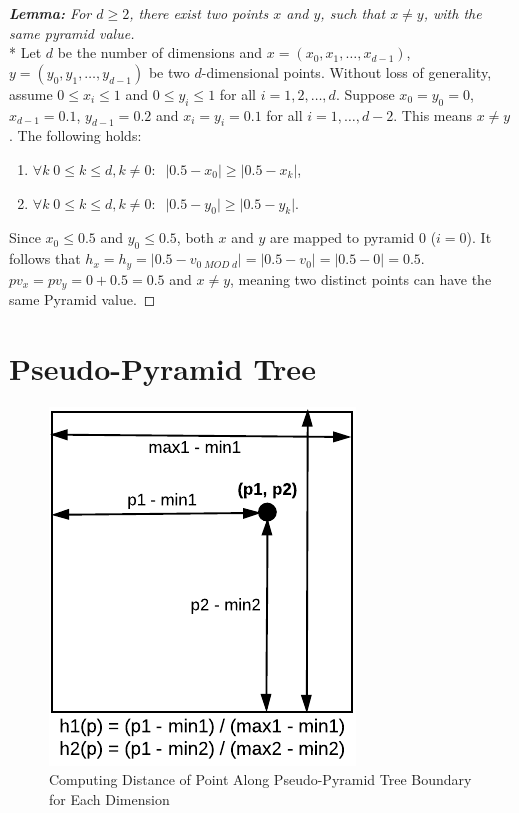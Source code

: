 \begin{proof}[\textbf{Lemma: } For $d \geq 2$, there exist two points $x$ and $y$, such that $x \neq y$, with the same pyramid value]\mbox{}\\*
Let $d$ be the number of dimensions and $x = (x_0, x_1, \dots, x_{d -1})$, $y = (y_0, y_1, \dots, y_{d - 1})$ be two $d$-dimensional points. Without loss of generality, assume $0 \leq x_i \leq 1$ and $0 \leq y_i \leq 1$ for all $i = 1, 2, \dots, d$. Suppose $x_0 = y_0 = 0$, $x_{d - 1} = 0.1$, $y_{d - 1} = 0.2$ and $x_i = y_i = 0.1$ for all $i = 1, \dots, {d - 2}$. This means $x \neq y$. The following holds:
\begin{enumerate}
	\item $\forall k \; 0 \leq k \leq d, k \neq 0: \;\; \lvert 0.5 - x_0 \rvert \geq \lvert 0.5 - x_k \rvert$,
	\item $\forall k \; 0 \leq k \leq d, k \neq 0: \;\; \lvert 0.5 - y_0 \rvert \geq \lvert 0.5 - y_k \rvert$.
\end{enumerate}
Since $x_0 \leq 0.5$ and $y_0 \leq 0.5$, both $x$ and $y$ are mapped to pyramid 0 ($i = 0$). It follows that $h_x = h_y = \lvert 0.5 - v_{0 \; MOD \; d} \rvert = \lvert 0.5 - v_{0} \rvert = \lvert 0.5 - 0 \rvert = 0.5$. $pv_x = pv_y = 0 + 0.5 = 0.5$ and $x \neq y$, meaning two distinct points can have the same Pyramid value.

\end{proof}

\section{Pseudo-Pyramid Tree}

\begin{figure}
	\vspace{-30pt}
	\begin{center}
		\includegraphics[scale=0.85]{figures/pseudo-pyramid_tree_point_boundary_distances.pdf}
	\end{center}
	\vspace{-20pt}
	\caption{Computing Distance of Point Along Pseudo-Pyramid Tree Boundary for Each Dimension}
	\label{fig:point-boundary-distance}
\end{figure}

